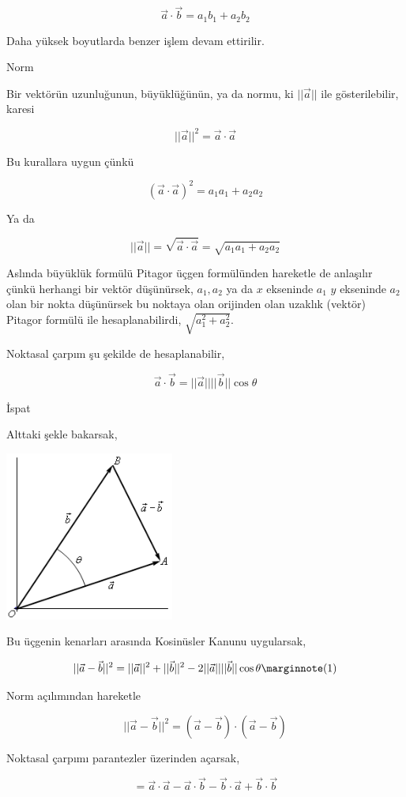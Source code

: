 \documentclass[12pt,fleqn]{article}\usepackage{../../common}
\begin{document}
$$
\vec{a} \cdot \vec{b} = a_1 b_1 + a_2 b_2
$$

Daha yüksek boyutlarda benzer işlem devam ettirilir. 

Norm

Bir vektörün uzunluğunun, büyüklüğünün, ya da normu, ki $||\vec{a}||$ ile
gösterilebilir, karesi

$$
||\vec{a}||^2 = \vec{a} \cdot \vec{a} 
$$

Bu kurallara uygun çünkü

$$
(\vec{a} \cdot \vec{a})^2 = a_1 a_1 + a_2 a_2
$$

Ya da

$$
||\vec{a}|| = \sqrt{\vec{a} \cdot \vec{a}} = \sqrt{a_1 a_1 + a_2 a_2}
$$

Aslında büyüklük formülü Pitagor üçgen formülünden hareketle de anlaşılır çünkü
herhangi bir vektör düşünürsek, $a_1,a_2$ ya da $x$ ekseninde $a_1$ $y$
ekseninde $a_2$ olan bir nokta düşünürsek bu noktaya olan orijinden olan uzaklık
(vektör) Pitagor formülü ile hesaplanabilirdi, $\sqrt{a_1^2 + a_2^2}$.

Noktasal çarpım şu şekilde de hesaplanabilir,

$$
\vec{a} \cdot \vec{b} = ||\vec{a}|| ||\vec{b}|| \cos\theta
$$

İspat

Alttaki şekle bakarsak,

\includegraphics[width=15em]{abcos.png}

Bu üçgenin kenarları arasında Kosinüsler Kanunu uygularsak,

$$
||\vec{a}-\vec{b}||^2 =
||\vec{a}||^2 + ||\vec{b}||^2 -
2 ||\vec{a}|| ||\vec{b}|| \cos\theta
\mlabel{1}
$$

Norm açılımından hareketle

$$
||\vec{a}-\vec{b}||^2 = (\vec{a}-\vec{b}) \cdot (\vec{a}-\vec{b}) 
$$

Noktasal çarpımı parantezler üzerinden açarsak,

$$
= \vec{a}\cdot\vec{a} - \vec{a}\cdot\vec{b} - \vec{b}\cdot\vec{a} + \vec{b}\cdot\vec{b}
$$
\end{document}
